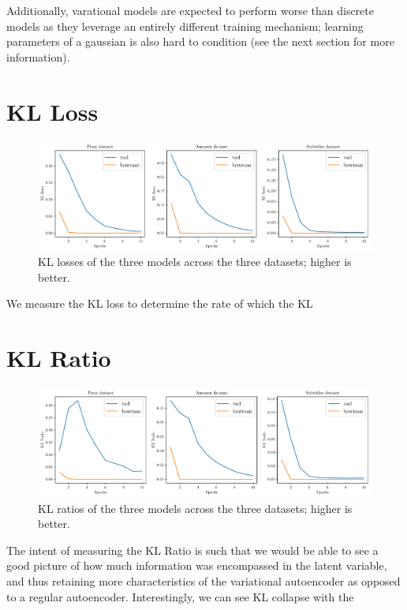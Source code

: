 \documentclass[12pt,twoside]{report}
\begin{document}
Additionally, varational models are expected to perform worse than discrete models as they leverage an entirely different training mechanism; learning parameters of a gaussian is also hard to condition (see the next section for more information).

\section{KL Loss}

\begin{figure}[!ht]
	\centering
	\includegraphics[width=150mm]{results/kl_loss.pdf}
	\caption{KL losses of the three models across the three datasets; higher is better.\label{r:kl_loss}}
	\end{figure}
	
We measure the KL loss to determine the rate of which the KL 


\section{KL Ratio}

\begin{figure}[!ht]
	\centering
	\includegraphics[width=150mm]{results/kl_ratio.pdf}
	\caption{KL ratios of the three models across the three datasets; higher is better.\label{r:kl_ratio}}
  \end{figure}

The intent of measuring the KL Ratio is such that we would be able to see a good picture of how much information was encompassed in the latent variable, and thus retaining more characteristics of the variational autoencoder as opposed to a regular autoencoder. 
Interestingly, we can see KL collapse with the 
\end{document}
